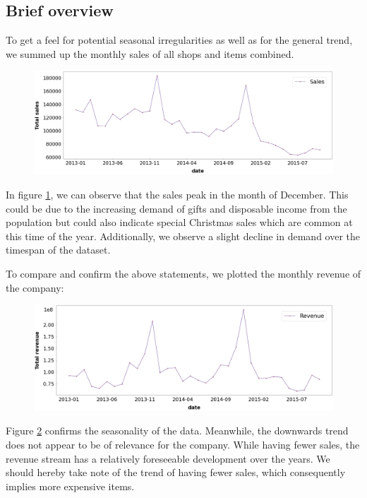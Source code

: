 \subsection{Brief overview}

To get a feel for potential seasonal irregularities as well as for the general trend, we summed up the monthly sales of all shops and items combined.

\begin{figure}[h]
  \centering
  \includegraphics[width=0.86\linewidth]{external_content/graphs/total_sales.png}
  \captionsetup{justification=centering}
  \label{fig:total_sales}
\end{figure}


In figure \ref{fig:total_sales}, we can observe that the sales peak in the month of December. This could be due to the increasing demand of gifts and disposable income from the population but could also indicate special Christmas sales which are common at this time of the year. Additionally, we observe a slight decline in demand over the timespan of the dataset.

To compare and confirm the above statements, we plotted the monthly revenue of the company:

\begin{figure}[h]
  \centering
  \includegraphics[width=0.9\linewidth]{external_content/graphs/total_revenue.png}
  \captionsetup{justification=centering}
  \label{fig:total_revenue}
\end{figure}

Figure \ref{fig:total_revenue} confirms the seasonality of the data. Meanwhile, the downwards trend does not appear to be of relevance for the company.
While having fewer sales, the revenue stream has a relatively foreseeable development over the years. 
We should hereby take note of the trend of having fewer sales, which consequently implies more expensive items.

